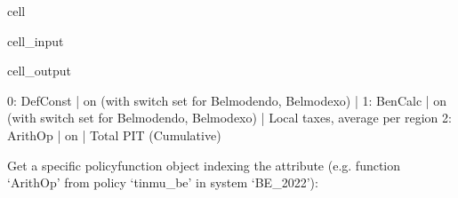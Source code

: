 \documentclass[letterpaper,10pt,english]{sphinxmanual}
\begin{document}
\begin{sphinxuseclass}{cell}
\begin{sphinxuseclass}{cell_input}
\begin{sphinxVerbatim}[commandchars=\\\{\}]
\PYG{p}{[}\PYG{p}{]}\PYG{p}{[}\PYG{p}{]}\PYG{p}{[}\PYG{p}{]}
\end{sphinxVerbatim}

\end{sphinxuseclass}
\begin{sphinxuseclass}{cell_output}
\begin{sphinxVerbatim}[commandchars=\\\{\}]
0: DefConst     | on (with switch set for Belmod\PYGZus{}endo, Belmod\PYGZus{}exo)       |     
1: BenCalc      | on (with switch set for Belmod\PYGZus{}endo, Belmod\PYGZus{}exo)       |    Local taxes, average per region 
2: ArithOp      | on                                                     |    Total PIT (Cumulative) 
\end{sphinxVerbatim}

\end{sphinxuseclass}
\end{sphinxuseclass}
\sphinxAtStartPar
Get a specific policy\sphinxhyphen{}function object indexing the  attribute (e.g. function ‘ArithOp’ from policy ‘tinmu\_be’ in system ‘BE\_2022’):
\end{document}
